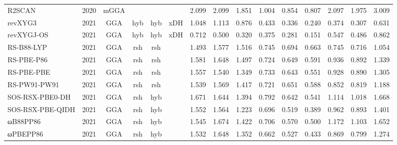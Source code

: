 \begin{landscape}
\begin{longtable}{lcccccrrrrrrrrr}
    R2SCAN           & 2020 & mGGA &          &             &           & 2.099             & 2.099             & 1.851  & 1.004              & 0.854             & 0.807  & 2.097   & 1.975 & 3.009 \\
    revXYG3          & 2021 & GGA  & hyb      & hyb         & xDH       & 1.048             & 1.113             & 0.876  & 0.433              & 0.336             & 0.240  & 0.374   & 0.307 & 0.631 \\
    revXYGJ-OS       & 2021 & GGA  & hyb      & hyb         & xDH       & 0.712             & 0.500             & 0.320  & 0.375              & 0.281             & 0.151  & 0.547   & 0.486 & 0.862 \\
    RS-B88-LYP       & 2021 & GGA  & rsh      & rsh         &           & 1.493             & 1.577             & 1.516  & 0.745              & 0.694             & 0.663  & 0.745   & 0.716 & 1.054 \\
    RS-PBE-P86       & 2021 & GGA  & rsh      & rsh         &           & 1.581             & 1.648             & 1.497  & 0.724              & 0.649             & 0.591  & 0.936   & 0.892 & 1.339 \\
    RS-PBE-PBE       & 2021 & GGA  & rsh      & rsh         &           & 1.557             & 1.540             & 1.349  & 0.733              & 0.643             & 0.551  & 0.928   & 0.890 & 1.305 \\
    RS-PW91-PW91     & 2021 & GGA  & rsh      & rsh         &           & 1.539             & 1.569             & 1.417  & 0.721              & 0.651             & 0.588  & 0.852   & 0.819 & 1.188 \\
    SOS-RSX-PBE0-DH  & 2021 & GGA  & rsh      & hyb         &           & 1.671             & 1.644             & 1.394  & 0.792              & 0.642             & 0.541  & 1.114   & 1.018 & 1.668 \\
    SOS-RSX-PBE-QIDH & 2021 & GGA  & rsh      & hyb         &           & 1.552             & 1.564             & 1.223  & 0.696              & 0.519             & 0.389  & 0.962   & 0.893 & 1.401 \\
    ωB88PP86         & 2021 & GGA  & rsh      & hyb         &           & 1.545             & 1.674             & 1.422  & 0.706              & 0.570             & 0.500  & 1.172   & 1.103 & 1.652 \\
    ωPBEPP86         & 2021 & GGA  & rsh      & hyb         &           & 1.532             & 1.648             & 1.352  & 0.662              & 0.527             & 0.433  & 0.869   & 0.799 & 1.274 \\

\end{longtable}
\end{landscape}
